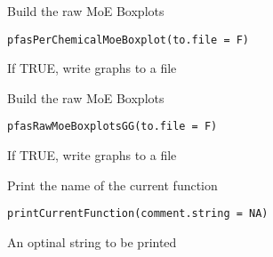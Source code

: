 \documentclass[letterpaper]{book}
\begin{document}
%
\begin{Description}\relax
Build the raw MoE Boxplots
\end{Description}
%
\begin{Usage}
\begin{verbatim}
pfasPerChemicalMoeBoxplot(to.file = F)
\end{verbatim}
\end{Usage}
%
\begin{Arguments}
\begin{ldescription}
\item[\code{to.file}] If TRUE, write graphs to a file
\end{ldescription}
\end{Arguments}
%
\begin{Description}\relax
Build the raw MoE Boxplots
\end{Description}
%
\begin{Usage}
\begin{verbatim}
pfasRawMoeBoxplotsGG(to.file = F)
\end{verbatim}
\end{Usage}
%
\begin{Arguments}
\begin{ldescription}
\item[\code{to.file}] If TRUE, write graphs to a file
\end{ldescription}
\end{Arguments}
%
\begin{Description}\relax
Print the name of the current function
\end{Description}
%
\begin{Usage}
\begin{verbatim}
printCurrentFunction(comment.string = NA)
\end{verbatim}
\end{Usage}
%
\begin{Arguments}
\begin{ldescription}
\item[\code{comment.string}] An optinal string to be printed
\end{ldescription}
\end{Arguments}
\printindex{}
\end{document}
